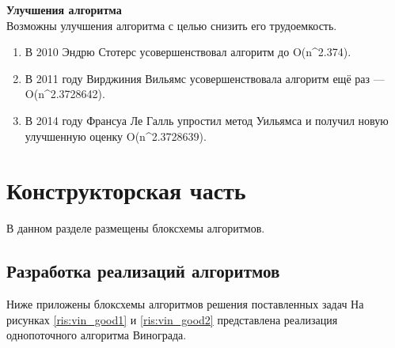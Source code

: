 \documentclass[a4paper, 14pt]{article}
\begin{document}
\normalsize \textbf {Улучшения алгоритма} \\

Возможны улучшения алгоритма с целью снизить его трудоемкость.

\begin{enumerate}
\item В 2010 Эндрю Стотерс усовершенствовал алгоритм до {\displaystyle O(n^{2.374}).}


\item В 2011 году Вирджиния Вильямс усовершенствовала алгоритм ещё раз — {\displaystyle O(n^{2.3728642}).}

\item В 2014 году Франсуа Ле Галль упростил метод Уильямса и получил новую улучшенную оценку {\displaystyle O(n^{2.3728639}).}

\end{enumerate}
	
		\newpage
	\section{Конструкторская часть}
	\hspace{1cm}В данном разделе размещены блоксхемы алгоритмов.
	\subsection{Разработка реализаций алгоритмов}
	
	\hspace{1cm}Ниже приложены блоксхемы алгоритмов решения поставленных задач
На рисунках \ref{ris:vin_good1} и \ref{ris:vin_good2} представлена реализация однопоточного алгоритма Винограда.
\end{document}
